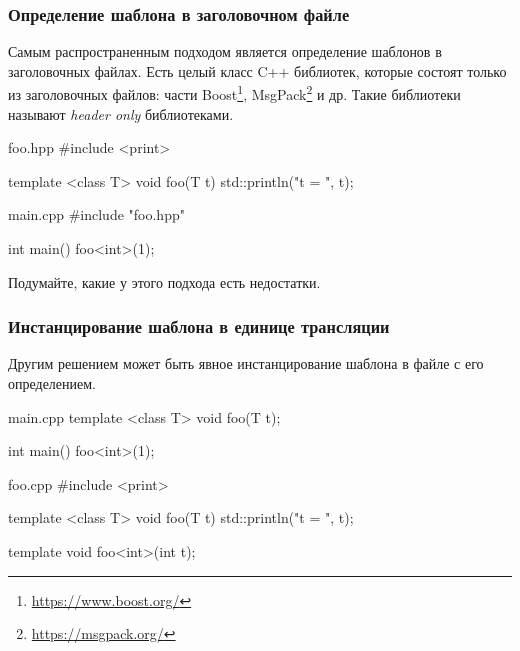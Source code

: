 \documentclass[compress, 8pt, aspectratio=169]{beamer}
\begin{document}
  \begin{frame}[fragile]

    \frametitle{Определение шаблона в заголовочном файле}

    Самым распространенным подходом является определение
    шаблонов в заголовочных файлах.
    Есть целый класс C++ библиотек, которые состоят только
    из заголовочных файлов: части Boost\footnote{\url{https://www.boost.org/}},
    MsgPack\footnote{\url{https://msgpack.org/}} и др.
    Такие библиотеки называют \textit{header only} библиотеками.

    \begin{mytitledinplacelisting}[minted language=cpp]{foo.hpp}
#include <print>

template <class T> void foo(T t) {
    std::println("t = {}", t);
}
    \end{mytitledinplacelisting}

    \begin{mytitledinplacelisting}[minted language=cpp]{main.cpp}
#include "foo.hpp"

int main() { foo<int>(1); }
    \end{mytitledinplacelisting}

    \begin{task}
      Подумайте, какие у этого подхода есть недостатки.
    \end{task}

  \end{frame}

  \begin{frame}[fragile]

    \frametitle{Инстанцирование шаблона в единице трансляции}

    Другим решением может быть явное инстанцирование шаблона
    в файле с его определением.

    \begin{mytitledinplacelisting}[minted language=cpp]{main.cpp}
template <class T>
void foo(T t);

int main() {
    foo<int>(1);
}
    \end{mytitledinplacelisting}

    \begin{mytitledinplacelisting}[minted language=cpp]{foo.cpp}
#include <print>

template <class T>
void foo(T t) {
    std::println("t = {}", t);
}

template void foo<int>(int t);
    \end{mytitledinplacelisting}

  \end{frame}
\end{document}
